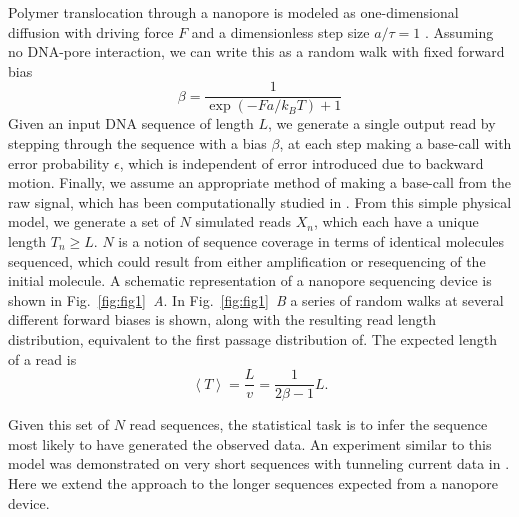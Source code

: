 \documentclass{biophys_letter}
\newcommand{\bias}{\beta}
\newcommand{\err}{\epsilon}
\newcommand{\kje}[1]{\textcolor{BurntOrange}{#1}}
\begin{document}
\begin{multicols}{2}
Polymer translocation through a nanopore is modeled as one-dimensional diffusion with driving force $F$ and a dimensionless step size $a/\tau=1$ \cite{Lubensky:1999}.
Assuming no DNA-pore interaction, we can write this as a random walk with fixed forward bias \cite{Berg:1993}
\begin{equation}
  \bias = \frac{1}{\exp(-Fa/k_{B}T) + 1}
\end{equation}
Given an input DNA sequence of length $L$, we generate a single output read by stepping through the sequence with a bias $\bias$, at each step making a base-call with error probability $\err$, which is independent of error introduced due to backward motion. 
Finally, we assume an appropriate method of making a base-call from the raw signal, which has been computationally studied in \cite{ODonnell:2013}.
From this simple physical model, we generate a set of $N$ simulated reads $X_n$, which each have a unique length $T_{n} \ge L$. 
$N$ is a notion of sequence coverage in terms of identical molecules sequenced, which could result from either amplification or resequencing of the initial molecule.
A schematic representation of a nanopore sequencing device is shown in Fig.~\ref{fig:fig1}\emph{~A}.
In Fig.~\ref{fig:fig1}\emph{~B} a series of random walks at several different forward biases is shown, along with the resulting read length distribution, equivalent to the first passage distribution of.
The expected length of a read is 
\begin{equation}
  \label{eq:expected-T}
  \left\langle T  \right\rangle = \frac{L}{v} = \frac{1}{2\bias-1} L.
\end{equation}

Given this set of $N$ read sequences, the statistical task is to infer the sequence most likely to have generated the observed data.
An experiment similar to this model was demonstrated on very short sequences with tunneling current data in \cite{Ohshiro:2012}.
Here we extend the approach to the longer sequences expected from a nanopore device.

\end{multicols}
\twocolumn
\end{document}
